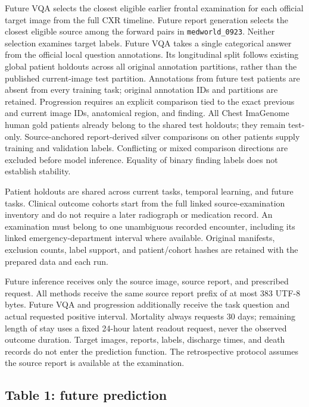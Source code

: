 Future VQA selects the closest eligible earlier frontal examination for each
official target image from the full CXR timeline. Future report generation
selects the closest eligible source among the forward pairs in
\texttt{medworld\_0923}. Neither selection examines target labels. Future VQA
takes a single categorical answer from the official local question annotations.
Its longitudinal split follows existing global patient holdouts across all
original annotation partitions, rather than the published current-image test
partition. Annotations from future test patients are absent from every training
task; original annotation IDs and partitions are retained. Progression requires an explicit comparison tied to the
exact previous and current image IDs, anatomical region, and finding. All
Chest ImaGenome human gold patients already belong to the shared test holdouts;
they remain test-only. Source-anchored report-derived silver comparisons on
other patients supply training and validation labels. Conflicting or mixed
comparison directions are excluded before model inference. Equality of binary
finding labels does not establish stability.

Patient holdouts are shared across current tasks, temporal learning, and future
tasks. Clinical outcome cohorts start from the full linked source-examination
inventory and do not require a later radiograph or medication record. An
examination must belong to one unambiguous recorded encounter, including its
linked emergency-department interval where available. Original manifests,
exclusion counts, label support, and patient/cohort hashes are retained with
the prepared data and each run.

Future inference receives only the source image, source report, and prescribed
request. All methods receive the same source report prefix of at most 383 UTF-8
bytes. Future VQA and progression additionally receive the task question and
actual requested positive interval. Mortality always requests 30 days;
remaining length of stay uses a fixed 24-hour latent readout request, never the
observed outcome duration. Target images, reports, labels, discharge times, and
death records do not enter the prediction function. The retrospective protocol
assumes the source report is available at the examination.

\subsection{Table 1: future prediction}

